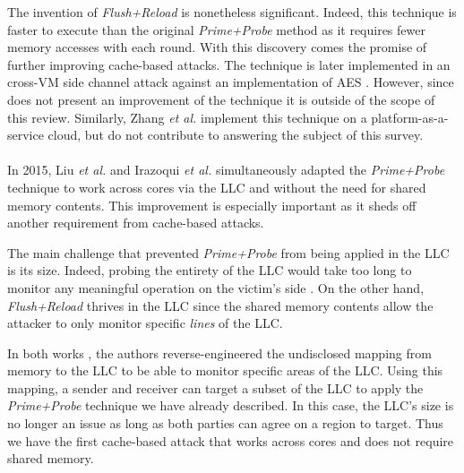 \documentclass[orivec,envcountsame, a4paper, 11pt]{llncs}
\begin{document}
The invention of \textit{Flush+Reload} is nonetheless significant. Indeed, this technique is faster to execute than the original \textit{Prime+Probe} method \cite{Yarom2014} as it requires fewer memory accesses with each round. With this discovery comes the promise of further improving cache-based attacks. The technique is later implemented in an cross-VM side channel attack against an implementation of AES \cite{Irazoqui2014}. However, since \cite{Irazoqui2014} does not present an improvement of the technique it is outside of the scope of this review. Similarly, Zhang \textit{et al.} \cite{Zhang2014} implement this technique on a platform-as-a-service cloud, but do not contribute to answering the subject of this survey.


\paragraph{} In 2015, Liu \textit{et al.} \cite{Liu2015} and Irazoqui \textit{et al.} \cite{Irazoqui2015} simultaneously adapted the \textit{Prime+Probe} technique to work across cores via the LLC and without the need for shared memory contents. This improvement is especially important as it sheds off another requirement from cache-based attacks.

The main challenge that prevented \textit{Prime+Probe} from being applied in the LLC is its size. Indeed, probing the entirety of the LLC would take too long to monitor any meaningful operation on the victim's side \cite{Liu2015}. On the other hand, \textit{Flush+Reload} thrives in the LLC since the shared memory contents allow the attacker to only monitor specific \textit{lines} of the LLC.

In both works \cite{Irazoqui2015,Liu2015}, the authors reverse-engineered the undisclosed mapping from memory to the LLC to be able to monitor specific areas of the LLC. Using this mapping, a sender and receiver can target a subset of the LLC to apply the \textit{Prime+Probe} technique we have already described. In this case, the LLC's size is no longer an issue as long as both parties can agree on a region to target. Thus we have the first cache-based attack that works across cores and does not require shared memory.

\end{document}
